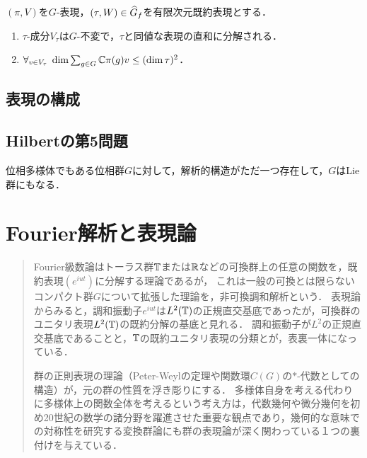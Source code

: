 \documentclass[uplatex,dvipdfmx]{jsreport}
\begin{document}
\begin{proposition}
    $(\pi,V)$を$G$-表現，$(\tau,W)\in\widehat{G}_f$を有限次元既約表現とする．
    \begin{enumerate}
        \item $\tau$-成分$V_\tau$は$G$-不変で，$\tau$と同値な表現の直和に分解される．
        \item $\forall_{v\in V_\tau}\;\dim\sum_{g\in G}\mathbb{C}\pi(g)v\le(\dim\tau)^2$．
    \end{enumerate}
\end{proposition}

\section{表現の構成}

\section{Hilbertの第5問題}

\begin{tcolorbox}[colframe=ForestGreen, colback=ForestGreen!10!white,breakable,colbacktitle=ForestGreen!40!white,coltitle=black,fonttitle=\bfseries\sffamily,
title=]
    位相多様体でもある位相群$G$に対して，解析的構造がただ一つ存在して，$G$はLie群にもなる．
\end{tcolorbox}

\chapter{Fourier解析と表現論}

\begin{quotation}
    Fourier級数論はトーラス群$\mathbb{T}$または$\mathbb{R}$などの可換群上の任意の関数を，既約表現$(e^{iut})$に分解する理論であるが，
    これは一般の可換とは限らないコンパクト群$G$について拡張した理論を，非可換調和解析という．
    表現論からみると，調和振動子$e^{iut}$は$L^2(\mathbb{T})$の正規直交基底であったが，可換群のユニタリ表現$L^2(\mathbb{T})$の既約分解の基底と見れる．
    調和振動子が$L^2$の正規直交基底であることと，$\mathbb{T}$の既約ユニタリ表現の分類とが，表裏一体になっている．

    群の正則表現の理論（Peter-Weylの定理や関数環$C(G)$の$*$-代数としての構造）が，元の群の性質を浮き彫りにする．
    多様体自身を考える代わりに多様体上の関数全体を考えるという考え方は，代数幾何や微分幾何を初め20世紀の数学の諸分野を躍進させた重要な観点であり，幾何的な意味での対称性を研究する変換群論にも群の表現論が深く関わっている１つの裏付けを与えている．
\end{quotation}
\end{document}
